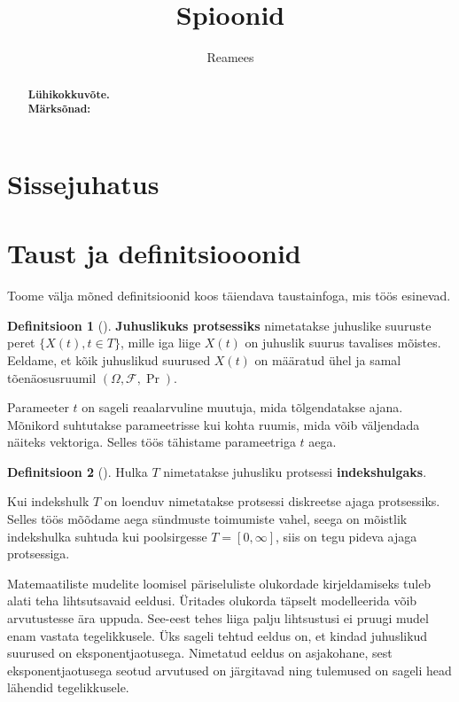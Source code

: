 \documentclass{article}
\theoremstyle{definition}
\newtheorem{definition}{Definitsioon}
\begin{document}
\title{Spioonid}
\author{Reamees}
\date{} %

\maketitle

\begin{abstract}
    \textbf{Lühikokkuvõte.} \\
    \textbf{Märksõnad:}
\end{abstract}

\section{Sissejuhatus}

\section{Taust ja definitsiooonid}

Toome välja mõned definitsioonid koos täiendava taustainfoga, mis töös esinevad.

\begin{definition}[\cite{juhuslikud-protsessid}]
    \textbf{Juhuslikuks protsessiks} nimetatakse juhuslike suuruste peret $\{ X(t) , t \in T \}$, mille iga liige $X(t)$ on juhuslik suurus tavalises mõistes. Eeldame, et kõik juhuslikud suurused $X(t)$ on määratud ühel ja samal tõenäosusruumil $(\Omega, \mathcal{F}, \Pr)$.
\end{definition}

Parameeter $t$ on sageli reaalarvuline muutuja, mida tõlgendatakse ajana. Mõnikord suhtutakse parameetrisse kui kohta ruumis, mida võib väljendada näiteks vektoriga. Selles töös tähistame parameetriga $t$ aega.

\begin{definition}[\cite{juhuslikud-protsessid}]
    Hulka $T$ nimetatakse juhusliku protsessi \textbf{indekshulgaks}.
\end{definition}

Kui indekshulk $T$ on loenduv nimetatakse protsessi diskreetse ajaga protsessiks. Selles töös mõõdame aega sündmuste toimumiste vahel, seega on mõistlik indekshulka suhtuda kui poolsirgesse $T= [0, \infty]$, siis on tegu pideva ajaga protsessiga.

Matemaatiliste mudelite loomisel päriseluliste olukordade kirjeldamiseks tuleb alati teha lihtsutsavaid eeldusi. Üritades olukorda täpselt modelleerida võib arvutustesse ära uppuda. See-eest tehes liiga palju lihtsustusi ei pruugi mudel enam vastata tegelikkusele. Üks sageli tehtud eeldus on, et kindad juhuslikud suurused on eksponentjaotusega. Nimetatud eeldus on asjakohane, sest eksponentjaotusega seotud arvutused on järgitavad ning tulemused on sageli head lähendid tegelikkusele. \cite[lk 291]{introduction-to-probability-models}
\end{document}

